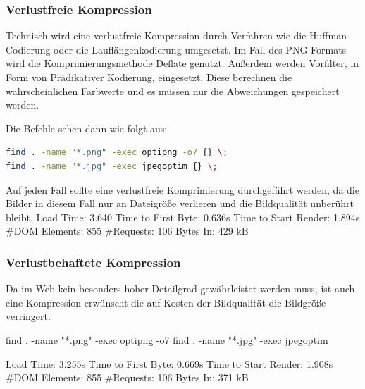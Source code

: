 \subsubsection{Verlustfreie Kompression} Technisch wird eine verlustfreie Kompression durch Verfahren wie die Huffman-Codierung oder die Lauflängenkodierung umgesetzt. Im Fall des PNG Formats wird die Komprimierungsmethode Deflate genutzt. Außerdem werden Vorfilter, in Form von Prädikativer Kodierung, eingesetzt. Diese berechnen die wahrscheinlichen Farbwerte und es müssen nur die Abweichungen gespeichert werden. 

Die Befehle sehen dann wie folgt aus:

\begin{lstlisting}[language=bash,label=Optimieren mit find,caption=Optimieren mit find]
find . -name "*.png" -exec optipng -o7 {} \;
find . -name "*.jpg" -exec jpegoptim {} \;
\end{lstlisting}
Auf jeden Fall sollte eine verlustfreie Komprimierung durchgeführt werden, da die Bilder in diesem Fall nur an Dateigröße verlieren und die Bildqualität unberührt bleibt. 
Load Time: 3.640
Time to First Byte: 0.636s %
Time to Start Render: 1.894s
\#DOM Elements: 855 	
\#Requests: 106 %
Bytes In: 429 kB %
\subsubsection{Verlustbehaftete Kompression} Da im Web kein besonders hoher Detailgrad gewährleistet werden muss, ist auch eine Kompression erwünscht die auf Kosten der Bildqualität die Bildgröße verringert. 

find . -name "*.png" -exec optipng -o7 {} \;
find . -name "*.jpg" -exec jpegoptim {} \;

Load Time: 3.255s
Time to First Byte: 0.669s %
Time to Start Render: 1.908s
\#DOM Elements: 855 	
\#Requests: 106 %
Bytes In: 371 kB %

